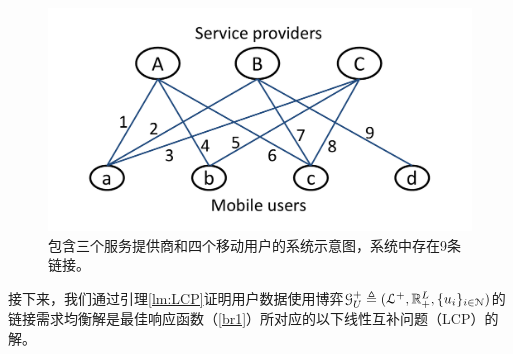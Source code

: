 \begin{figure}
\centering
\includegraphics[scale=0.4]{./pic/layout.pdf}
\caption{包含三个服务提供商和四个移动用户的系统示意图，系统中存在9条链接。}\label{fg:layout}
\end{figure}

接下来，我们通过引理\ref{lm:LCP}证明用户数据使用博弈$\mathcal{G}_U^{+}\triangleq(\mathcal{L}^+,\mathbb{R}_+^L,\{u_i\}_{i\in\mathcal{N}})$的链接需求均衡解是最佳响应函数（\ref{br1}）所对应的以下线性互补问题（LCP）\cite{lcp}的解。


